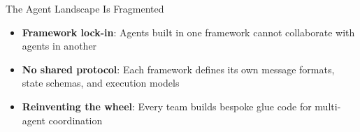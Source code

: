 \begin{frame}{The Agent Landscape Is Fragmented}
\begin{center}
  \end{center}

  \begin{itemize}
    \item \textbf{Framework lock-in}: Agents built in one framework cannot collaborate with agents in another
    \item \textbf{No shared protocol}: Each framework defines its own message formats, state schemas, and execution models
    \item \textbf{Reinventing the wheel}: Every team builds bespoke glue code for multi-agent coordination
  \end{itemize}
  \normalsize
\end{frame}
